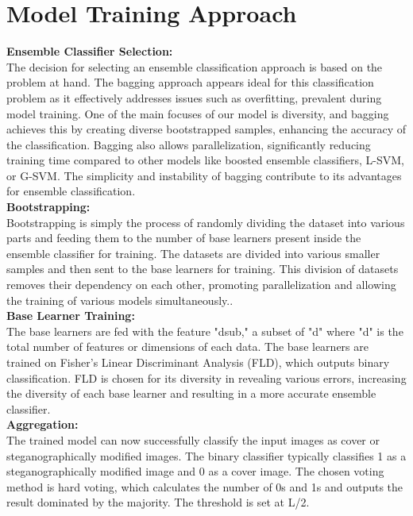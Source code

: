 \section{Model Training Approach}
\textbf{Ensemble Classifier Selection:}\\
The decision for selecting an ensemble classification approach is based on the problem at hand. The bagging approach appears ideal for this classification problem as it effectively addresses issues such as overfitting, prevalent during model training. One of the main focuses of our model is diversity, and bagging achieves this by creating diverse bootstrapped samples, enhancing the accuracy of the classification. Bagging also allows parallelization, significantly reducing training time compared to other models like boosted ensemble classifiers, L-SVM, or G-SVM. The simplicity and instability of bagging contribute to its advantages for ensemble classification.\vspace{0.25cm}\\
\textbf{Bootstrapping:}\\
Bootstrapping is simply the process of randomly dividing the dataset into various parts and feeding them to the number of base learners present inside the ensemble classifier for training. The datasets are divided into various smaller samples and then sent to the base learners for training. This division of datasets removes their dependency on each other, promoting parallelization and allowing the training of various models simultaneously..\vspace{0.25cm}\\
\textbf{Base Learner Training:}\\
The base learners are fed with the feature "dsub," a subset of "d" where "d" is the total number of features or dimensions of each data. The base learners are trained on Fisher's Linear Discriminant Analysis (FLD), which outputs binary classification. FLD is chosen for its diversity in revealing various errors, increasing the diversity of each base learner and resulting in a more accurate ensemble classifier.\vspace{0.25cm}\\
\textbf{Aggregation:}\\
The trained model can now successfully classify the input images as cover or steganographically modified images. The binary classifier typically classifies 1 as a steganographically modified image and 0 as a cover image. The chosen voting method is hard voting, which calculates the number of 0s and 1s and outputs the result dominated by the majority. The threshold is set at L/2.
